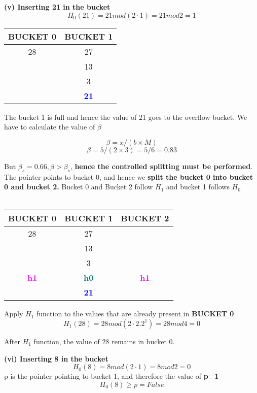\textbf{(v) Inserting 21 in the bucket}
\[H_0(21) = 21 mod (2 \cdot 1)  = 21 mod 2 = 1\] 

\begin{center}
\begin{tabular}{ |c|c| } 
 \hline
 \textbf{\color{red}{P}} BUCKET 0 & BUCKET 1 \\ [0.5ex] 
 \hline\hline
 \hline
  28 & 27 \\ 
   & 13   \\
   & 3 \\
 \hline
    & \textbf{\textcolor{blue}{21}}
    
\end{tabular}
\end{center}

The bucket 1 is full and hence the value of 21 goes to the overflow bucket. 
We have to calculate the value of $\beta$

\[\beta = x/(b \times M)\]
\[\beta = 5/(2 \times 3) = 5/6 = 0.83\]

But $\beta_s = 0.66 , \beta>\beta_s$,\textbf{ hence the controlled splitting must be performed}. The pointer points to bucket 0, and hence we \textbf{split the bucket 0 into bucket 0 and bucket 2.} Bucket 0 and Bucket 2 follow $H_1$ and bucket 1 follows $H_0$
\\
\\
\begin{center}
\begin{tabular}{ |c|c|c| } 
 \hline
 BUCKET 0 & \textbf{\color{red}{P}} BUCKET 1 & BUCKET 2\\ [0.5ex] 
 \hline\hline
 \hline
  28 & 27 & \\ 
   & 13 & \\
   & 3 & \\
 \hline
 \hline
\textbf{\textcolor{magenta}{h1}} & \textbf{\textcolor{teal}{h0}}& \textbf{\textcolor{magenta}{h1}}\\ [0.5ex] 
 \hline
     & \textbf{\textcolor{blue}{21}}
\end{tabular}
\end{center}
\newpage

Apply $H_1$ function to the values that are already present in \textbf{BUCKET 0}
\[H_1(28) = 28 mod (2 \cdot 2.2^1)  = 28 mod 4 = 0\]

After $H_1$ function, the value of 28 remains in bucket 0.


\textbf{(vi) Inserting 8 in the bucket}
\[H_0(8) = 8 mod (2 \cdot 1)  = 8 mod 2 = 0\]
    p is the pointer pointing to bucket 1, and therefore the value of \textbf{p=1}
\[H_0(8)\ge p = False\]

